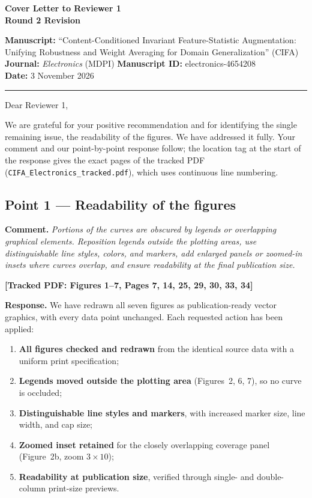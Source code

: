 \documentclass[11pt]{article}
\newcommand{\loc}[1]{\textbf{[\textcolor{revblue}{Tracked PDF: #1}]}}
\begin{document}
\begin{center}
{\Large\textbf{Cover Letter to Reviewer 1}}\\[0.5em]
\textbf{Round 2 Revision}
\end{center}

\textbf{Manuscript:} ``Content-Conditioned Invariant Feature-Statistic
Augmentation: Unifying Robustness and Weight Averaging for Domain
Generalization'' (CIFA)\\
\textbf{Journal:} \textit{Electronics} (MDPI)\qquad
\textbf{Manuscript ID:} electronics-4654208\\
\textbf{Date:} 3 November 2026

\hrule
\vspace{0.4em}

Dear Reviewer 1,

We are grateful for your positive recommendation and for identifying the single
remaining issue, the readability of the figures. We have addressed it fully.
Your comment and our point-by-point response follow; the location tag at the
start of the response gives the exact pages of the tracked PDF
(\texttt{CIFA\_Electronics\_tracked.pdf}), which uses continuous line numbering.

\subsection*{Point 1 --- Readability of the figures}

\textbf{Comment.} \textit{Portions of the curves are obscured by legends or
overlapping graphical elements. Reposition legends outside the plotting areas,
use distinguishable line styles, colors, and markers, add enlarged panels or
zoomed-in insets where curves overlap, and ensure readability at the final
publication size.}

\loc{Figures 1--7, Pages 7, 14, 25, 29, 30, 33, 34}

\textbf{Response.} We have redrawn all seven figures as publication-ready
vector graphics, with every data point unchanged. Each requested action has
been applied:

\begin{enumerate}[label=(\arabic*)]
\item \textbf{All figures checked and redrawn} from the identical source data
with a uniform print specification;
\item \textbf{Legends moved outside the plotting area} (Figures~2, 6, 7), so no
curve is occluded;
\item \textbf{Distinguishable line styles and markers}, with increased marker
size, line width, and cap size;
\item \textbf{Zoomed inset retained} for the closely overlapping coverage panel
(Figure~2b, zoom $3\times10$);
\item \textbf{Readability at publication size}, verified through single- and
double-column print-size previews.
\end{enumerate}
\end{document}
